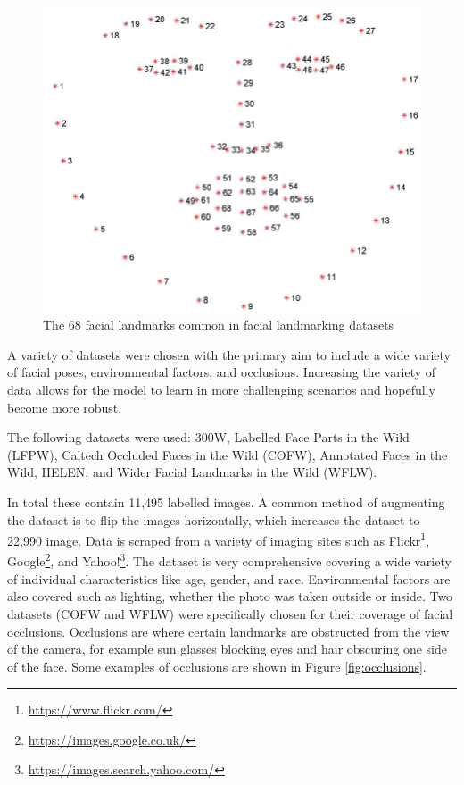 \begin{figure}[h]
    \centering
    \includegraphics[width=0.5\linewidth]{dissertation//figures/facial-landmarks.jpg}
    \caption{The 68 facial landmarks common in facial landmarking datasets\cite{sagonas2016300}}
    \label{fig:facial-landarks}
\end{figure}

A variety of datasets were chosen with the primary aim to include a wide variety of facial poses, environmental factors, and occlusions. Increasing the variety of data allows for the model to learn in more challenging scenarios and hopefully become more robust.

The following datasets were used: 300W\cite{sagonas2016300}\cite{sagonas2013300}\cite{sagonas2013semi}, Labelled Face Parts in the Wild (LFPW)\cite{belhumeur2013localizing}\cite{mondal2021lfpw}, Caltech Occluded Faces in the Wild (COFW)\cite{burgos2022caltech}, Annotated Faces in the Wild\cite{zhu2012face}, HELEN\cite{le2012interactive}, and Wider Facial Landmarks in the Wild (WFLW)\cite{wayne2018lab}.

In total these contain 11,495 labelled images. A common method of augmenting the dataset is to flip the images horizontally, which increases the dataset to 22,990 image. Data is scraped from a variety of imaging sites such as Flickr\footnote{\url{https://www.flickr.com/}}, Google\footnote{\url{https://images.google.co.uk/}}, and Yahoo!\footnote{\url{https://images.search.yahoo.com/}}. The dataset is very comprehensive covering a wide variety of individual characteristics like age, gender, and race. Environmental factors are also covered such as lighting, whether the photo was taken outside or inside. 
Two datasets (COFW and WFLW) were specifically chosen for their coverage of facial occlusions. Occlusions are where certain landmarks are obstructed from the view of the camera, for example sun glasses blocking eyes and hair obscuring one side of the face. Some examples of occlusions are shown in Figure \ref{fig:occlusions}.

